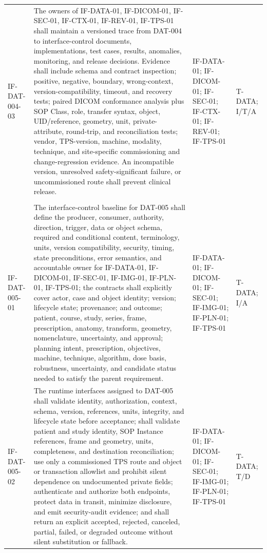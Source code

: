 \documentclass[11pt,letterpaper]{article}
\begin{document}
\begin{scriptsize}
\begin{longtable}{@{}L{0.14\textwidth}L{0.49\textwidth}L{0.19\textwidth}L{0.10\textwidth}@{}}
\mbox{IF-DAT-004-03} & The owners of IF-DATA-01, IF-DICOM-01, IF-SEC-01, IF-CTX-01, IF-REV-01, IF-TPS-01 shall maintain a versioned trace from DAT-004 to interface-control documents, implementations, test cases, results, anomalies, monitoring, and release decisions. Evidence shall include schema and contract inspection; positive, negative, boundary, wrong-context, version-compatibility, timeout, and recovery tests; paired DICOM conformance analysis plus SOP Class, role, transfer syntax, object, UID\slash\allowbreak{}reference, geometry, unit, private-attribute, round-trip, and reconciliation tests; vendor, TPS-version, machine, modality, technique, and site-specific commissioning and change-regression evidence. An incompatible version, unresolved safety-significant failure, or uncommissioned route shall prevent clinical release. & IF-DATA-01; IF-DICOM-01; IF-SEC-01; IF-CTX-01; IF-REV-01; IF-TPS-01 & T-DATA; I\slash\allowbreak{}T\slash\allowbreak{}A \\
\addlinespace[2pt]
 \\
\addlinespace[2pt]
\mbox{IF-DAT-005-01} & The interface-control baseline for DAT-005 shall define the producer, consumer, authority, direction, trigger, data or object schema, required and conditional content, terminology, units, version compatibility, security, timing, state preconditions, error semantics, and accountable owner for IF-DATA-01, IF-DICOM-01, IF-SEC-01, IF-IMG-01, IF-PLN-01, IF-TPS-01; the contracts shall explicitly cover actor, case and object identity; version; lifecycle state; provenance; and outcome; patient, course, study, series, frame, prescription, anatomy, transform, geometry, nomenclature, uncertainty, and approval; planning intent, prescription, objectives, machine, technique, algorithm, dose basis, robustness, uncertainty, and candidate status needed to satisfy the parent requirement. & IF-DATA-01; IF-DICOM-01; IF-SEC-01; IF-IMG-01; IF-PLN-01; IF-TPS-01 & T-DATA; I\slash\allowbreak{}A \\
\addlinespace[2pt]
\mbox{IF-DAT-005-02} & The runtime interfaces assigned to DAT-005 shall validate identity, authorization, context, schema, version, references, units, integrity, and lifecycle state before acceptance; shall validate patient and study identity, SOP Instance references, frame and geometry, units, completeness, and destination reconciliation; use only a commissioned TPS route and object or transaction allowlist and prohibit silent dependence on undocumented private fields; authenticate and authorize both endpoints, protect data in transit, minimize disclosure, and emit security-audit evidence; and shall return an explicit accepted, rejected, canceled, partial, failed, or degraded outcome without silent substitution or fallback. & IF-DATA-01; IF-DICOM-01; IF-SEC-01; IF-IMG-01; IF-PLN-01; IF-TPS-01 & T-DATA; T\slash\allowbreak{}D \\

\end{longtable}
\end{scriptsize}
\end{document}
